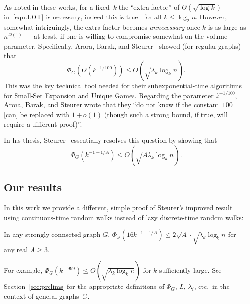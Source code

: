\documentclass[11pt]{article}
\begin{document}
{As noted in these works, for a fixed~$k$ the ``extra factor'' of $\Theta(\sqrt{\log k})$ in~\eqref{eqn:LOT} is necessary; indeed this is true~\cite{LOT12} for all $k \leq \log_2 n$.  However, somewhat intriguingly, the extra factor becomes \emph{unnecessary} once $k$ is as large as $n^{\Omega(1)}$ --- at least, if one is willing to compromise somewhat on the volume parameter.  Specifically, Arora, Barak, and Steurer~\cite{ABS10} showed (for regular graphs) that
\begin{equation} \label{eqn:ABS}
    \Phi_G(O(k^{-1/100})) \leq O(\sqrt{\lambda_k \log_k n}).
\end{equation}
This was the key technical tool needed for their subexponential-time algorithms for Small-Set Expansion and Unique Games.  Regarding the parameter $k^{-1/100}$, Arora, Barak, and Steurer wrote that they ``do not know if the constant~$100$ [can] be replaced with $1 + o(1)$ (though such a strong bound, if true, will require a different proof)''.

In his thesis, Steurer~\cite{Ste10a} essentially resolves this question by showing that
\begin{equation}
\Phi_G(k^{-1+1/A}) \leq O(\sqrt{A \lambda_k \log_k n}).
\end{equation}


\subsection{Our results}
In this work we provide a different, simple proof of Steurer's improved result using continuous-time random walks instead of lazy discrete-time random walks:
\begin{theorem} \label{thm:our-conductance-profile}
    In any strongly connected graph $G$, $\Phi_G(16 k^{-1+1/A}) \leq 2\sqrt{A} \cdot \sqrt{\lambda_k \log_k n}$ for any real $A \geq 3$.
\end{theorem}
\noindent For example, $\Phi_G(k^{-.999}) \leq O(\sqrt{\lambda_k \log_k n})$ for $k$ sufficiently large.  See Section~\ref{sec:prelims} for the appropriate definitions of $\Phi_G$, $L$, $\lambda_i$, etc.\ in the context of general graphs~$G$.\\

}
\end{document}
